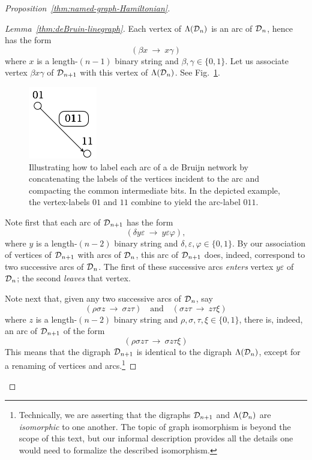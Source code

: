 \begin{proof}[Proposition~\ref{thm:named-graph-Hamiltonian}]
\begin{proof}[Lemma~\ref{thm:deBruin-linegraph}]
Each vertex of $\Lambda(\mbox{$\cal D$}_n)$ is an arc of $\mbox{$\cal D$}_n$, hence has the form
\[ (\beta x \ \rightarrow \ x \gamma) \]
where $x$ is a length-$(n-1)$ binary string and $\beta, \gamma \in \{0,1\}$.  Let us 
associate vertex $\beta x \gamma$ of $\mbox{$\cal D$}_{n+1}$ with this vertex of $\Lambda(\mbox{$\cal D$}_n)$.
See Fig.~\ref{fig:dBlabelEdge-App}.
\begin{figure}[hbt]
\begin{center}
       \includegraphics[scale=0.5]{FiguresGraph/dBlabelEdge}
\caption{Illustrating how to label each arc of a de Bruijn network by concatenating the labels
of the vertices incident to the arc and compacting the common intermediate bits.  In the 
depicted example, the vertex-labels $01$ and $11$ combine to yield the arc-label $011$.}
  \label{fig:dBlabelEdge-App}
\end{center}
\end{figure}

\smallskip

Note first that each arc of $\mbox{$\cal D$}_{n+1}$ has the form
\[ (\delta y \varepsilon \ \rightarrow \ y \varepsilon \varphi), \]
where $y$ is a length-$(n-2)$ binary string and $\delta, \varepsilon, \varphi \in \{0,1\}$.  
By our association of vertices of $\mbox{$\cal D$}_{n+1}$ with arcs of $\mbox{$\cal D$}_n$, this arc of $\mbox{$\cal D$}_{n+1}$ does, 
indeed, correspond to two successive arcs of $\mbox{$\cal D$}_n$.   The first of these successive arcs
{\em enters} vertex $y \varepsilon$ of $\mbox{$\cal D$}_n$; the second {\em leaves} that vertex.

Note next that, given any two successive arcs of $\mbox{$\cal D$}_n$, say
\[
(\rho \sigma z \ \rightarrow \ \sigma z \tau) \ \ \ \mbox { and } \ \ \
(\sigma z \tau \ \rightarrow \  z \tau \xi)
\]
where $z$ is a length-$(n-2)$ binary string and $\rho, \sigma, \tau,
\xi \in \{0,1\}$, there is, indeed, an arc of $\mbox{$\cal D$}_{n+1}$ of the form
\[ (\rho \sigma z \tau \ \rightarrow \ \sigma z \tau \xi) \]
This means that the digraph $\mbox{$\cal D$}_{n+1}$ is identical to the digraph
$\Lambda(\mbox{$\cal D$}_n)$, except for a renaming of vertices and arcs.\footnote{Technically,
  we are asserting that the digraphs ${\cal D}_{n+1}$ and ${\Lambda}({\cal D}_n)$ 
  are {\it isomorphic} to one another.  The topic of graph isomorphism is beyond the 
  scope of this text, but our informal description provides all the details one would 
  need to formalize the described isomorphism.}


\end{proof}
\end{proof}
